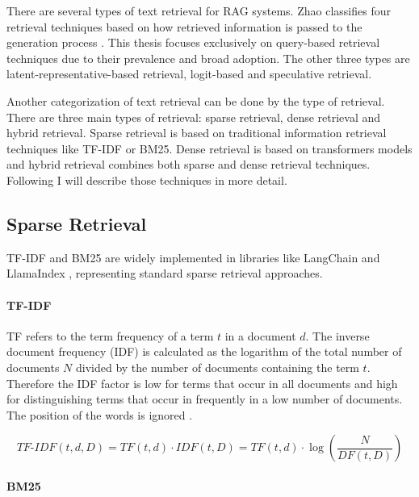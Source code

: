 
There are several types of text retrieval for RAG systems. Zhao classifies four retrieval techniques based on how retrieved information is passed to the generation process \cite{Zhao.29.02.2024}. This thesis focuses exclusively on query-based retrieval techniques due to their prevalence and broad adoption. The other three types are latent-representative-based retrieval, logit-based and speculative retrieval.

Another categorization of text retrieval can be done by the type of retrieval. There are three main types of retrieval: sparse retrieval, dense retrieval and hybrid retrieval. Sparse retrieval is based on traditional information retrieval techniques like TF-IDF or BM25. Dense retrieval is based on transformers models and hybrid retrieval combines both sparse and dense retrieval techniques. Following I  will describe those techniques in more detail.
\subsection{Sparse Retrieval}
\label{sec:sparse_retrieval}

TF-IDF and BM25 are widely implemented in libraries like LangChain \cite{Chase_LangChain_2022} and LlamaIndex \cite{Liu_LlamaIndex_2022}, representing standard sparse retrieval approaches.

\paragraph{TF-IDF}
\label{sec:tfidf}

TF refers to the term frequency of a term $t$ in a document $d$. The inverse document frequency (IDF) is calculated as the logarithm of the total number of documents $N$ divided by the number of documents containing the term $t$. Therefore the IDF factor is low for terms that occur in all documents and high for distinguishing terms that occur in frequently in a low number of documents. The position of the words is ignored \cite{Manning.2009}.

$$\textit{TF-IDF}(t, d, D) = \textit{TF}(t, d) \cdot \textit{IDF}(t, D) = \textit{TF}(t, d) \cdot \log\left(\frac{N}{\textit{DF}(t, D)}\right)
$$

\paragraph{BM25}
\label{sec:bm25}

